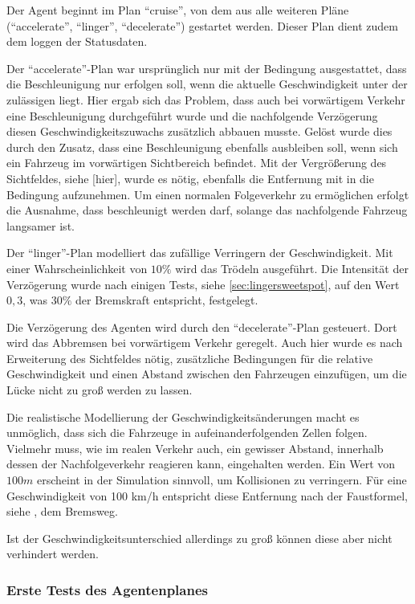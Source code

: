 Der Agent beginnt im Plan \enquote{cruise}, von dem aus alle weiteren Pläne (\enquote{accelerate}, \enquote{linger}, \enquote{decelerate}) gestartet werden.
Dieser Plan dient zudem dem loggen der Statusdaten.

Der \enquote{accelerate}-Plan war ursprünglich nur mit der Bedingung ausgestattet, dass die Beschleunigung nur erfolgen soll, wenn die aktuelle Geschwindigkeit unter der zulässigen liegt.
Hier ergab sich das Problem, dass auch bei vorwärtigem Verkehr eine Beschleunigung durchgeführt wurde und die nachfolgende Verzögerung diesen Geschwindigkeitszuwachs zusätzlich abbauen musste.
Gelöst wurde dies durch den Zusatz, dass eine Beschleunigung ebenfalls ausbleiben soll, wenn sich ein Fahrzeug im vorwärtigen Sichtbereich befindet.
Mit der Vergrößerung des Sichtfeldes, siehe [hier], wurde es nötig, ebenfalls die Entfernung mit in die Bedingung aufzunehmen.
Um einen normalen Folgeverkehr zu ermöglichen erfolgt die Ausnahme, dass beschleunigt werden darf, solange das nachfolgende Fahrzeug langsamer ist.

Der \enquote{linger}-Plan modelliert das zufällige Verringern der Geschwindigkeit. 
Mit einer Wahrscheinlichkeit von $10 \%$ wird das Trödeln ausgeführt.
Die Intensität der Verzögerung wurde nach einigen Tests, siehe \cref{sec:lingersweetspot}, auf den Wert $0,3$, was $30 \%$ der Bremskraft entspricht, festgelegt.

Die Verzögerung des Agenten wird durch den \enquote{decelerate}-Plan gesteuert. 
Dort wird das Abbremsen bei vorwärtigem Verkehr geregelt. Auch hier wurde es nach Erweiterung des Sichtfeldes nötig, zusätzliche Bedingungen für die relative Geschwindigkeit und einen Abstand zwischen den Fahrzeugen einzufügen, um die Lücke nicht zu groß werden zu lassen.

Die realistische Modellierung der Geschwindigkeitsänderungen macht es unmöglich, dass sich die Fahrzeuge in aufeinanderfolgenden Zellen folgen.
Vielmehr muss, wie im realen Verkehr auch, ein gewisser Abstand, innerhalb dessen der Nachfolgeverkehr reagieren kann, eingehalten werden.
Ein Wert von $100 m$ erscheint in der Simulation sinnvoll, um Kollisionen zu verringern. 
Für eine Geschwindigkeit von 100 km/h entspricht diese Entfernung nach der Faustformel, siehe \cite{bremsweg}, dem Bremsweg.

Ist der Geschwindigkeitsunterschied allerdings zu groß können diese aber nicht verhindert werden.


\subsubsection{Erste Tests des Agentenplanes}

